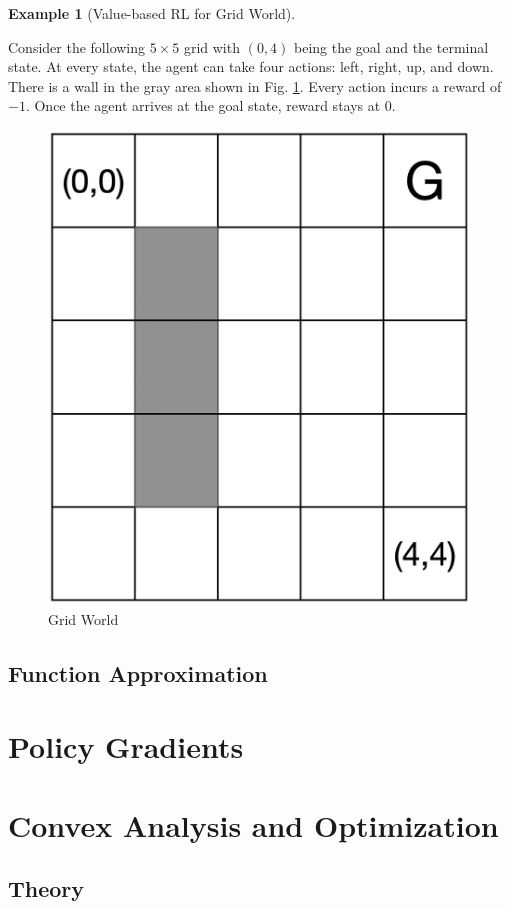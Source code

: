 \documentclass[
]{book}
\theoremstyle{definition}
\theoremstyle{definition}
\newtheorem{example}{Example}[chapter]
\theoremstyle{definition}
\theoremstyle{definition}
\theoremstyle{remark}
\begin{document}
\begin{example}[Value-based RL for Grid World]
\protect\hypertarget{exm:GridWorldMCControl}{}\label{exm:GridWorldMCControl}

Consider the following \(5 \times 5\) grid with \((0,4)\) being the goal and the terminal state. At every state, the agent can take four actions: left, right, up, and down. There is a wall in the gray area shown in Fig. \ref{fig:grid-world}. Every action incurs a reward of \(-1\). Once the agent arrives at the goal state, reward stays at 0.

\begin{figure}

{\centering \includegraphics[width=0.4\linewidth]{images/Value-RL/grid-world} 

}

\caption{Grid World}\label{fig:grid-world}
\end{figure}

\end{example}

\section{Function Approximation}\label{function-approximation}

\chapter{Policy Gradients}\label{policy-gradient}

\appendix


\chapter{Convex Analysis and Optimization}\label{appconvex}

\section{Theory}\label{appconvex-theory}
\end{document}
